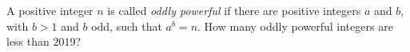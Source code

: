 A positive integer $n$ is called \emph{oddly powerful} if there are positive integers $a$ and $b$, with $b>1$ and $b$ odd, such that $a^b=n$. How many oddly powerful integers are less than $2019$?
